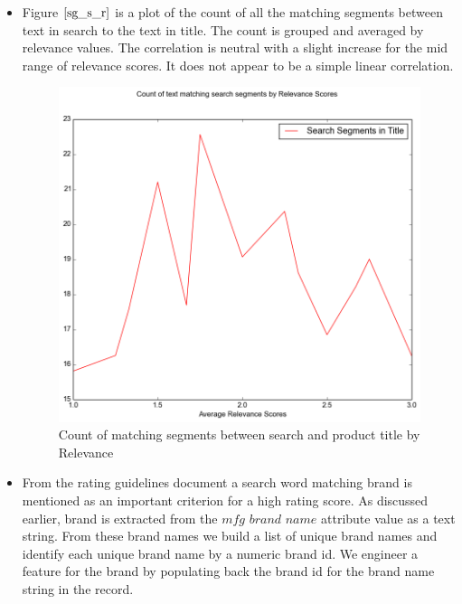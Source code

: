 \documentclass[twoside,12pt]{article}
\begin{document}
\begin{itemize}
\FloatBarrier
\item 
Figure $\eqref{sg_s_r}$ is a plot of the count of all the matching segments between text in search to the text in title. The count is grouped and averaged by relevance values. The correlation is neutral with a slight increase for the mid range of relevance scores. It does not appear to be a simple linear correlation.
\FloatBarrier
\begin{figure}[!htbp]
	\centering
	\includegraphics[scale=.43]{DataVisualization/srch_seg_relv_plot.png} 
	\caption{Count of matching segments between search and product title by Relevance}
	\label{sg_s_r}
\end{figure}

\FloatBarrier
\item
From the rating guidelines document a search word matching brand is mentioned as an important criterion for a high rating score. As discussed earlier, brand is extracted from the $\textit{mfg brand name}$ attribute value as a text string. From these brand names we build a list of unique brand names and identify each unique brand name by a numeric brand id. We engineer a feature for the brand by populating back the brand id for the brand name string in the record. 


\end{itemize}
\end{document}
